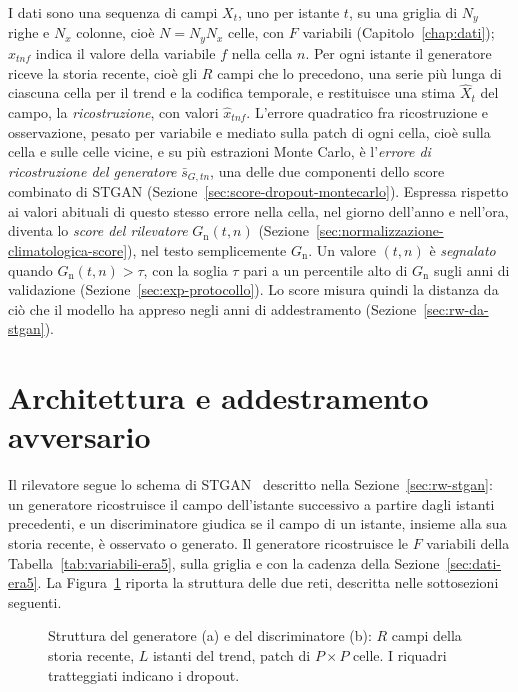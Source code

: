 I dati sono una sequenza di campi $X_t$, uno per istante $t$, su una griglia di $N_y$ righe e $N_x$ colonne, cioè $N=N_yN_x$ celle, con $F$ variabili (Capitolo~\ref{chap:dati}); $x_{tnf}$ indica il valore della variabile $f$ nella cella $n$. Per ogni istante il generatore riceve la storia recente, cioè gli $R$ campi che lo precedono, una serie più lunga di ciascuna cella per il trend e la codifica temporale, e restituisce una stima $\hat{X}_t$ del campo, la \emph{ricostruzione}, con valori $\hat{x}_{tnf}$. L'errore quadratico fra ricostruzione e osservazione, pesato per variabile e mediato sulla patch di ogni cella, cioè sulla cella e sulle celle vicine, e su più estrazioni Monte Carlo, è l'\emph{errore di ricostruzione del generatore} $\bar{s}_{G,tn}$, una delle due componenti dello score combinato di STGAN (Sezione~\ref{sec:score-dropout-montecarlo}). Espressa rispetto ai valori abituali di questo stesso errore nella cella, nel giorno dell'anno e nell'ora, diventa lo \emph{score del rilevatore} $G_{\mathrm{n}}(t,n)$ (Sezione~\ref{sec:normalizzazione-climatologica-score}), nel testo semplicemente $G_{\mathrm{n}}$. Un valore $(t,n)$ è \emph{segnalato} quando $G_{\mathrm{n}}(t,n)>\tau$, con la soglia $\tau$ pari a un percentile alto di $G_{\mathrm{n}}$ sugli anni di validazione (Sezione~\ref{sec:exp-protocollo}). Lo score misura quindi la distanza da ciò che il modello ha appreso negli anni di addestramento (Sezione~\ref{sec:rw-da-stgan}).

\section{Architettura e addestramento avversario}
\label{sec:stgan}

Il rilevatore segue lo schema di STGAN~\cite{deng2022stgan} descritto nella Sezione~\ref{sec:rw-stgan}: un generatore ricostruisce il campo dell'istante successivo a partire dagli istanti precedenti, e un discriminatore giudica se il campo di un istante, insieme alla sua storia recente, è osservato o generato. Il generatore ricostruisce le $F$ variabili della Tabella~\ref{tab:variabili-era5}, sulla griglia e con la cadenza della Sezione~\ref{sec:dati-era5}. La Figura~\ref{fig:architettura-stgan} riporta la struttura delle due reti, descritta nelle sottosezioni seguenti.

\begin{figure}[htbp]
    \centering
    \resizebox{\textwidth}{!}{}  %
    \caption{Struttura del generatore (a) e del discriminatore (b): $R$ campi della storia recente, $L$ istanti del trend, patch di $P\times P$ celle. I riquadri tratteggiati indicano i dropout.}
    \label{fig:architettura-stgan}
\end{figure}

